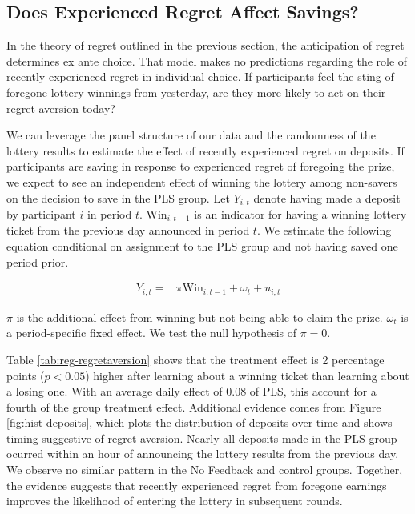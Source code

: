 \documentclass[11pt]{article}
\begin{document}
	\subsection{Does Experienced Regret Affect Savings?}


		In the theory of regret outlined in the previous section, the anticipation of regret determines ex ante choice. That model makes no predictions regarding the role of recently experienced regret in individual choice. If participants feel the sting of foregone lottery winnings from yesterday, are they more likely to act on their regret aversion today?

		We can leverage the panel structure of our data and the randomness of the lottery results to estimate the effect of recently experienced regret on deposits. If participants are saving in response to experienced regret of foregoing the prize, we expect to see an independent effect of winning the lottery among non-savers on the decision to save in the PLS group. Let $Y_{i,t}$ denote having made a deposit by participant $i$ in period $t$. $\text{Win}_{i,t-1}$ is an indicator for having a winning lottery ticket from the previous day announced in period $t$. We estimate the following equation conditional on assignment to the PLS group and not having saved one period prior.

		\begin{equation} \begin{split}
		Y_{i,t} = & \pi \text{Win}_{i,t-1} + \omega_{t} + u_{i,t}
		\end{split} \label{eq:regret} \end{equation}

		$\pi$ is the additional effect from winning but not being able to claim the prize. $\omega_{t}$ is a period-specific fixed effect. We test the null hypothesis of $\pi = 0$.

		

		Table \ref{tab:reg-regretaversion} shows that the treatment effect is 2 percentage points ($p<0.05$) higher after learning about a winning ticket than learning about a losing one. With an average daily effect of 0.08 of PLS, this account for a fourth of the group treatment effect. Additional evidence comes from Figure \ref{fig:hist-deposits}, which plots the distribution of deposits over time and shows timing suggestive of regret aversion. Nearly all deposits made in the PLS group ocurred within an hour of announcing the lottery results from the previous day. We observe no similar pattern in the No Feedback and control groups. Together, the evidence suggests that recently experienced regret from foregone earnings improves the likelihood of entering the lottery in subsequent rounds.
\end{document}
